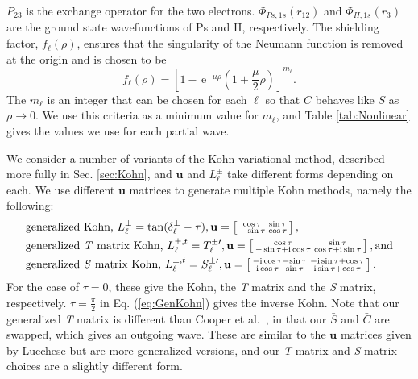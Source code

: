 \documentclass[preprint,showpacs,preprintnumbers,amsmath,amssymb,longbibliography,pra,aps]{revtex4-1}
\newcommand{\ee} {\,\text{e}}
\newcommand{\ii}{{\rm{i}}}
\begin{document}
$P_{23}$ is the exchange operator for the two electrons. $\Phi_{Ps,1s}\left(r_{12}\right)$ and $\Phi_{H,1s}\left(r_3\right)$ are the ground state wavefunctions of Ps and H, respectively. The shielding factor, $f_\ell(\rho)$, ensures that the singularity of the Neumann function is removed at the origin and is chosen to be
\begin{equation}
f_\ell(\rho) = \left[1 - \ee^{-\mu \rho} \left(1+\frac{\mu}{2}\rho\right)\right]^{m_\ell}.
\label{eq:PartialWaveShielding}
\end{equation}
The $m_\ell$ is an integer that can be chosen for each $\ell$ so that $\bar{C}$ behaves like $\bar{S}$ as $\rho \rightarrow 0$. We use this criteria as a minimum value for $m_\ell$, and Table \ref{tab:Nonlinear} gives the values we use for each partial wave.

We consider a number of variants of the Kohn variational method, described more fully in Sec. \ref{sec:Kohn}, and $\textbf{u}$ and $L^{\pm}_\ell$ take different forms depending on each. We use different $\textbf{u}$ matrices to generate multiple Kohn methods, namely the following:
\begin{subequations}
\label{eq:KohnU}
\begin{align}
&\text{generalized Kohn, } L^{\pm}_\ell = \tan(\delta^{\pm}_\ell-\tau), \textbf{u} = \left[ \begin{smallmatrix}
\cos \tau & \sin \tau \\  -\sin \tau & \cos \tau
\end{smallmatrix} \right], \label{eq:GenKohn}\\
&\text{generalized \emph{T} matrix Kohn, } L^{\pm,t}_\ell = T_\ell^{\pm\prime}, \textbf{u} = \left[ \begin{smallmatrix}
\cos\tau & \sin\tau \\ -\sin\tau + \ii \cos\tau & \cos\tau + \ii \sin\tau
\end{smallmatrix} \right], \text{and}\label{eq:GenTKohn} \\
&\text{generalized \emph{S} matrix Kohn, } L^{\pm,t}_\ell = S_\ell^{\pm\prime}, \textbf{u} = \left[ \begin{smallmatrix}
-\ii \cos\tau - \sin\tau & -\ii\sin\tau + \cos\tau \\ \ii\cos\tau - \sin\tau & \ii\sin\tau + \cos\tau
\end{smallmatrix} \right]. \label{eq:GenSKohn}
\end{align}
\end{subequations}
For the case of $\tau = 0$, these give the Kohn, the \emph{T} matrix and the \emph{S} matrix, respectively. $\tau = \frac{\pi}{2}$ in Eq. (\ref{eq:GenKohn}) gives the inverse Kohn. Note that our generalized \emph{T} matrix is different than Cooper et al.\ \cite{Cooper2010}, in that our $\bar{S}$ and $\bar{C}$ are swapped, which gives an outgoing wave. These are similar to the $\textbf{u}$ matrices given by Lucchese \cite{Lucchese1989} but are more generalized versions, and our \emph{T} matrix and \emph{S} matrix choices are a slightly different form.
\end{document}
